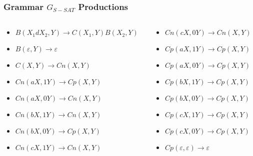 \documentclass{beamer}
\begin{document}
\begin{frame}
    \frametitle{Grammar $G_{S-SAT}$ Productions}

    \begin{columns}
        \begin{column}{0.5\textwidth}
            \begin{itemize}
                \item $B(X_1dX_2,Y)\to C(X_1,Y) B(X_2,Y)$
                \item $B(\varepsilon,Y)\to\varepsilon$

                \item $C(X,Y)\to Cn(X,Y)$

                \item $Cn(aX,1Y) \to Cp(X,Y)$
                \item $Cn(aX,0Y) \to Cn(X,Y)$
                \item $Cn(bX,1Y) \to Cn(X,Y)$
                \item $Cn(bX,0Y) \to Cp(X,Y)$
                \item $Cn(cX,1Y) \to Cn(X,Y)$

            \end{itemize}
        \end{column}
        \begin{column}{0.5\textwidth}
            \begin{itemize}
                \item $Cn(cX,0Y) \to Cn(X,Y)$
                \item $Cp(aX,1Y) \to Cp(X,Y)$
                \item $Cp(aX,0Y) \to Cp(X,Y)$
                \item $Cp(bX,1Y) \to Cp(X,Y)$
                \item $Cp(bX,0Y) \to Cp(X,Y)$
                \item $Cp(cX,1Y) \to Cp(X,Y)$
                \item $Cp(cX,0Y) \to Cp(X,Y)$
                \item $Cp(\varepsilon,\varepsilon)\to \varepsilon$
            \end{itemize}
        \end{column}
    \end{columns}
\end{frame}
\end{document}
